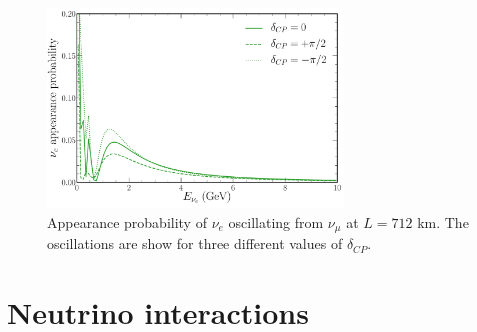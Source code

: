 \begin{figure} %
    \includegraphics[origin=c,width=0.7\textwidth]{diagrams/6-cvn/chipsnet/explore_osc_cp_probs.pdf}
    \caption[$\nu_{e}$ appearance probability for different $\delta_{CP}$ values]
    {Appearance probability of $\nu_{e}$ oscillating from $\nu_{\mu}$ at $L=712$ km. The
        oscillations are show for three different values of $\delta_{CP}$.}
    \label{fig:osc_cp_probs}
\end{figure}

\section{Neutrino interactions} %
\label{sec:theory_interactions} %

